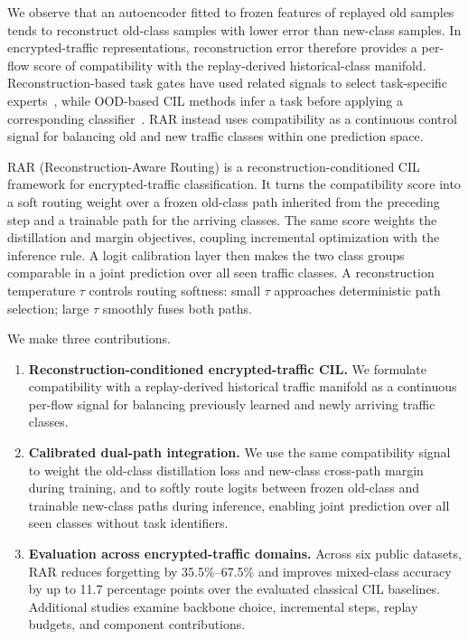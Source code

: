 We observe that an autoencoder fitted to frozen features of replayed old samples tends to reconstruct old-class samples with lower error than new-class samples. In encrypted-traffic representations, reconstruction error therefore provides a per-flow score of compatibility with the replay-derived historical-class manifold. Reconstruction-based task gates have used related signals to select task-specific experts~\cite{aljundi2017expertgate}, while OOD-based CIL methods infer a task before applying a corresponding classifier~\cite{kim2022clom,kim2022theoretical,kim2022more,lin2024tpl}. RAR instead uses compatibility as a continuous control signal for balancing old and new traffic classes within one prediction space.

RAR (Reconstruction-Aware Routing) is a reconstruction-conditioned CIL framework for encrypted-traffic classification. It turns the compatibility score into a soft routing weight over a frozen old-class path inherited from the preceding step and a trainable path for the arriving classes. The same score weights the distillation and margin objectives, coupling incremental optimization with the inference rule. A logit calibration layer then makes the two class groups comparable in a joint prediction over all seen traffic classes. A reconstruction temperature $\tau$ controls routing softness: small $\tau$ approaches deterministic path selection; large $\tau$ smoothly fuses both paths.

We make three contributions.
\begin{enumerate}
  \item \textbf{Reconstruction-conditioned encrypted-traffic CIL.} We formulate compatibility with a replay-derived historical traffic manifold as a continuous per-flow signal for balancing previously learned and newly arriving traffic classes.
  \item \textbf{Calibrated dual-path integration.} We use the same compatibility signal to weight the old-class distillation loss and new-class cross-path margin during training, and to softly route logits between frozen old-class and trainable new-class paths during inference, enabling joint prediction over all seen classes without task identifiers.
  \item \textbf{Evaluation across encrypted-traffic domains.} Across six public datasets, RAR reduces forgetting by 35.5\%--67.5\% and improves mixed-class accuracy by up to 11.7 percentage points over the evaluated classical CIL baselines. Additional studies examine backbone choice, incremental steps, replay budgets, and component contributions.
\end{enumerate}

